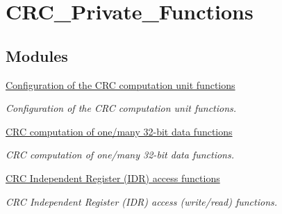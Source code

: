 \hypertarget{group___c_r_c___private___functions}{\section{C\-R\-C\-\_\-\-Private\-\_\-\-Functions}
\label{group___c_r_c___private___functions}
}
\subsection*{Modules}
\begin{DoxyCompactItemize}
\item 
\hyperlink{group___c_r_c___group1}{Configuration of the C\-R\-C computation unit functions}
\begin{DoxyCompactList}\small\item\em Configuration of the C\-R\-C computation unit functions. \end{DoxyCompactList}\item 
\hyperlink{group___c_r_c___group2}{C\-R\-C computation of one/many 32-\/bit data functions}
\begin{DoxyCompactList}\small\item\em C\-R\-C computation of one/many 32-\/bit data functions. \end{DoxyCompactList}\item 
\hyperlink{group___c_r_c___group3}{C\-R\-C Independent Register (\-I\-D\-R) access functions}
\begin{DoxyCompactList}\small\item\em C\-R\-C Independent Register (I\-D\-R) access (write/read) functions. \end{DoxyCompactList}\end{DoxyCompactItemize}

